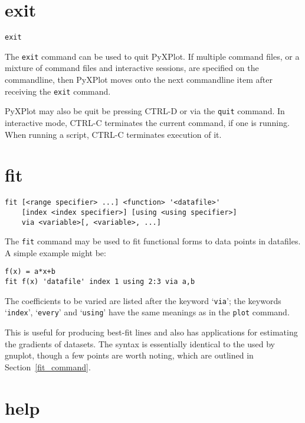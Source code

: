 \documentclass[a4paper,onecolumn,11pt]{book}
\begin{document}
\section{exit}

\begin{verbatim}
exit
\end{verbatim}

The {\tt exit} command can be used to quit PyXPlot. If multiple command files,
or a mixture of command files and interactive sessions, are specified on the
commandline, then PyXPlot moves onto the next commandline item after receiving
the {\tt exit} command.

PyXPlot may also be quit be pressing CTRL-D or via the {\tt quit} command. In
interactive mode, CTRL-C terminates the current command, if one is running.
When running a script, CTRL-C terminates execution of it.


\section{fit}

\begin{verbatim}
fit [<range specifier> ...] <function> '<datafile>'
    [index <index specifier>] [using <using specifier>]
    via <variable>[, <variable>, ...]
\end{verbatim}

The {\tt fit} command may be used to fit functional forms to data points in
datafiles. A simple example might be:

\begin{verbatim}
f(x) = a*x+b
fit f(x) 'datafile' index 1 using 2:3 via a,b
\end{verbatim}

The coefficients to be varied are listed after the keyword `{\tt via}'; the
keywords `{\tt index}', `{\tt every}' and `{\tt using}' have the same meanings as in
the {\tt plot} command.

This is useful for producing best-fit lines and also has applications for
estimating the gradients of datasets.  The syntax is essentially identical to
the used by gnuplot, though a few points are worth noting, which are outlined
in Section~\ref{fit_command}.

\section{help}
\end{document}
